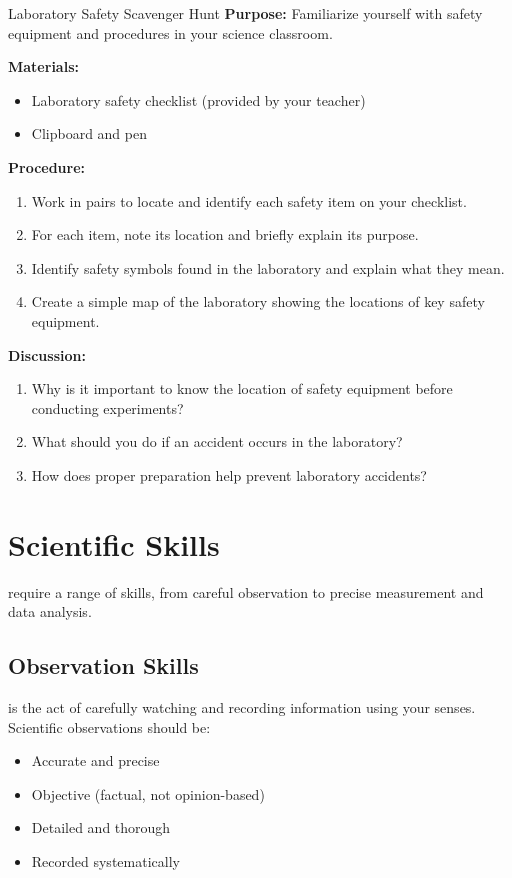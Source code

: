 \begin{investigation}{Laboratory Safety Scavenger Hunt}
\textbf{Purpose:} Familiarize yourself with safety equipment and procedures in your science classroom.

\textbf{Materials:}
\begin{itemize}
    \item Laboratory safety checklist (provided by your teacher)
    \item Clipboard and pen
\end{itemize}

\textbf{Procedure:}
\begin{enumerate}
    \item Work in pairs to locate and identify each safety item on your checklist.
    \item For each item, note its location and briefly explain its purpose.
    \item Identify safety symbols found in the laboratory and explain what they mean.
    \item Create a simple map of the laboratory showing the locations of key safety equipment.
\end{enumerate}

\textbf{Discussion:}
\begin{enumerate}
    \item Why is it important to know the location of safety equipment before conducting experiments?
    \item What should you do if an accident occurs in the laboratory?
    \item How does proper preparation help prevent laboratory accidents?
\end{enumerate}
\end{investigation}

\section{Scientific Skills}

 require a range of skills, from careful observation to precise measurement and data analysis.

\subsection{Observation Skills}

 is the act of carefully watching and recording information using your senses. Scientific observations should be:
\begin{itemize}
    \item Accurate and precise
    \item Objective (factual, not opinion-based)
    \item Detailed and thorough
    \item Recorded systematically
\end{itemize}

